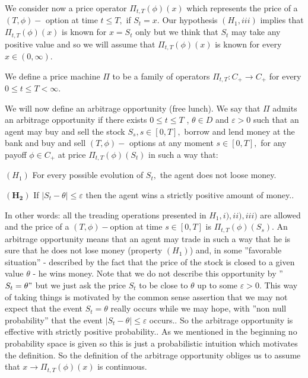 \documentclass[a4paper]{article}
\begin{document}
We consider now a price operator $\Pi _{t,T}(\phi )(x)$ which represents the
price of a $(T,\phi )-$ option at time $t\leq T,$ if $S_{t}=x.$ Our
hypothesis $(H_{1},iii)$ implies that $\Pi _{t,T}(\phi )(x)$ is known for $%
x=S_{t}$ only but we think that $S_{t}$ may take any positive value and so
we will assume that $\Pi _{t,T}(\phi )(x)$ is known for every $x\in
(0,\infty ).$

We define a price machine $\Pi $ to be a family of operators $\Pi
_{t,T}:C_{+}\rightarrow C_{+}$ for every $0\leq t\leq T<\infty .$

We will now define an arbitrage opportunity (free lunch). We say that $\Pi $
admits an arbitrage opportunity if there exists $0\leq t\leq T$ , $\theta
\in D$ and $\varepsilon >0$ such that an agent may buy and sell the stock $%
S_{s},s\in [0,T],$ borrow and lend money at the bank and buy and sell $%
(T,\phi )-$ options at any moment $s\in [0,T],$ for any payoff $\phi \in
C_{+}$ at price $\Pi _{t,T}(\phi )(S_{t})$ in such a way that:

$(H_{1})$ For every possible evolution of $S_{t},$ the agent does not loose
money.

$\mathbf{(H_{2})}$ If $\left| S_{t}-\theta \right| \leq \varepsilon $ then the agent
wins a strictly positive amount of money..

In other words: all the treading operations presented in $H_{1},i),ii),iii)$
are allowed and the price of a $(T,\phi )-$option at time $s\in [0,T]$ is $%
\Pi _{t,T}(\phi )(S_{s}).$ An arbitrage opportunity means that an agent may
trade in such a way that he is sure that he does not lose money (property $%
(H_{1})$) and, in some ''favorable situation'' - described by the fact that
the price of the stock is closed to a given value $\theta $ - he wins money.
Note that we do not describe this opportunity by ''$S_{t}=\theta "$ but we
just ask the price $S_{t}$ to be close to $\theta $ up to some $\varepsilon
>0.$ This way of taking things is motivated by the common sense assertion
that we may not expect that the event $S_{t}=\theta $ really occurs while we
may hope, with ''non null probability'' that the event $\left| S_{t}-\theta
\right| \leq \varepsilon $ occurs.. So the arbitrage opportunity is
effective with strictly positive probability.. As we mentioned in the
beginning no probability space is given so this is just a probabilistic
intuition which motivates the definition. So the definition of the arbitrage
opportunity obliges us to assume that $x\rightarrow \Pi _{t,T}(\phi )(x)$ is
continuous.
\end{document}
